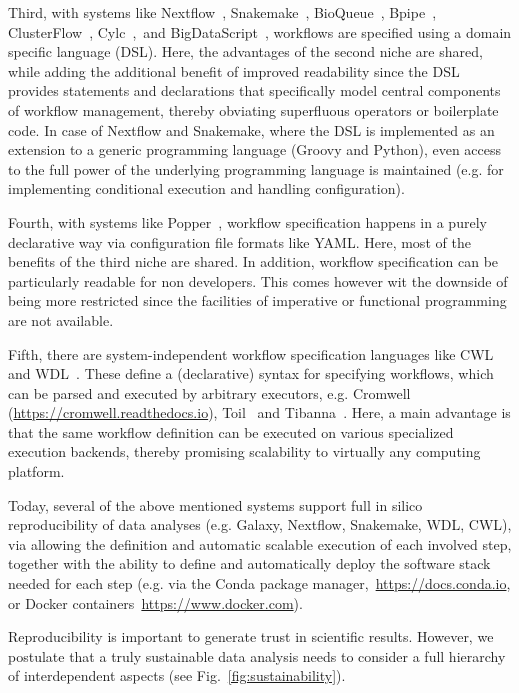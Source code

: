 \documentclass[parskip=half]{scrartcl}
\let\plainurl\url
\renewcommand{\url}[1]{\protect\plainurl{#1}}
\begin{document}
Third, with systems like Nextflow~\parencite{Di_Tommaso_2017}, Snakemake~\parencite{Köster2012}, BioQueue~\parencite{Yao2017}, Bpipe~\parencite{Sadedin2012}, ClusterFlow~\parencite{Ewels2016}, Cylc~\parencite{J_Oliver_2018},~and BigDataScript~\parencite{Cingolani_2014}, workflows are specified using a domain specific language (DSL).
Here, the advantages of the second niche are shared, while adding the additional benefit of improved readability since the DSL provides statements and declarations that specifically model central components of workflow management, thereby obviating superfluous operators or boilerplate code.
In case of Nextflow and Snakemake, where the DSL is implemented as an extension to a generic programming language (Groovy and Python), even access to the full power of the underlying programming language is maintained (e.g. for implementing conditional execution and handling configuration).

Fourth, with systems like Popper~\parencite{Jimenez_2017}, workflow specification happens in a purely declarative way via configuration file formats like YAML.
Here, most of the benefits of the third niche are shared.
In addition, workflow specification can be particularly readable for non developers.
This comes however wit the downside of being more restricted since the facilities of imperative or functional programming are not available.

Fifth, there are system-independent workflow specification languages like CWL~\parencite{cwl} and WDL~\parencite{voss_full-stack_2017}.
These define a (declarative) syntax for specifying workflows, which can be parsed and executed by arbitrary executors, e.g. Cromwell (\url{https://cromwell.readthedocs.io}), Toil~\parencite{Vivian_2017} and Tibanna~\parencite{Lee_2019}.
Here, a main advantage is that the same workflow definition can be executed on various specialized execution backends, thereby promising scalability to virtually any computing platform.

Today, several of the above mentioned systems support full in silico reproducibility of data analyses (e.g. Galaxy, Nextflow, Snakemake, WDL, CWL), via allowing the definition and automatic scalable execution of each involved step, together with the ability to define and automatically deploy the software stack needed for each step (e.g. via the Conda package manager,~\url{https://docs.conda.io}, or Docker containers~\url{https://www.docker.com}).

Reproducibility is important to generate trust in scientific results.
However, we postulate that a truly sustainable data analysis needs to consider a full hierarchy of interdependent aspects (see Fig.~\ref{fig:sustainability}).
\end{document}
